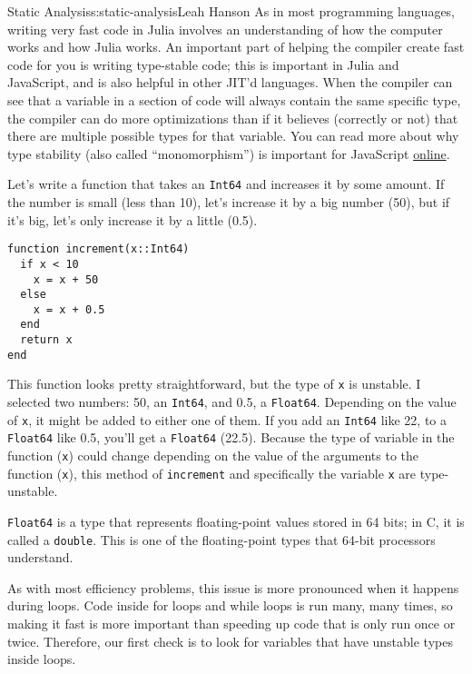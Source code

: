 \begin{aosachapter}{Static Analysis}{s:static-analysis}{Leah Hanson}
As in most programming languages, writing very fast code in Julia
involves an understanding of how the computer works and how Julia works.
An important part of helping the compiler create fast code for you is
writing type-stable code; this is important in Julia and JavaScript, and
is also helpful in other JIT'd languages. When the compiler can see that
a variable in a section of code will always contain the same specific
type, the compiler can do more optimizations than if it believes
(correctly or not) that there are multiple possible types for that
variable. You can read more about why type stability (also called
``monomorphism'') is important for JavaScript
\href{http://mrale.ph/blog/2015/01/11/whats-up-with-monomorphism.html}{online}.

\label{why-this-is-important}

Let's write a function that takes an \texttt{Int64} and increases it by
some amount. If the number is small (less than 10), let's increase it by
a big number (50), but if it's big, let's only increase it by a little
(0.5).

\begin{verbatim}
function increment(x::Int64)
  if x < 10
    x = x + 50
  else
    x = x + 0.5
  end
  return x
end
\end{verbatim}

This function looks pretty straightforward, but the type of \texttt{x}
is unstable. I selected two numbers: 50, an \texttt{Int64}, and 0.5, a
\texttt{Float64}. Depending on the value of \texttt{x}, it might be
added to either one of them. If you add an \texttt{Int64} like 22, to a
\texttt{Float64} like 0.5, you'll get a \texttt{Float64} (22.5). Because
the type of variable in the function (\texttt{x}) could change depending
on the value of the arguments to the function (\texttt{x}), this method
of \texttt{increment} and specifically the variable \texttt{x} are
type-unstable.

\texttt{Float64} is a type that represents floating-point values stored
in 64 bits; in C, it is called a \texttt{double}. This is one of the
floating-point types that 64-bit processors understand.

As with most efficiency problems, this issue is more pronounced when it
happens during loops. Code inside for loops and while loops is run many,
many times, so making it fast is more important than speeding up code
that is only run once or twice. Therefore, our first check is to look
for variables that have unstable types inside loops.


\end{aosachapter}

